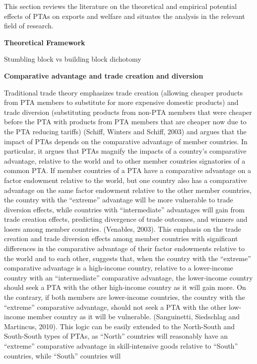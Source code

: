 This section reviews the literature on the theoretical and empirical
potential effects of PTAs on exports and welfare and situates the
analysis in the relevant field of research.

\textbf{Theoretical Framework}

Stumbling block vs building block dichotomy

\textbf{Comparative advantage and trade creation and diversion}

Traditional trade theory emphasizes trade creation (allowing cheaper
products from PTA members to substitute for more expensive domestic
products) and trade diversion (substituting products from non-PTA
members that were cheaper before the PTA with products from PTA members
that are cheaper now due to the PTA reducing tariffs) (Schiff, Winters
and Schiff, 2003) and argues that the impact of PTAs depends on the
comparative advantage of member countries. In particular, it argues that
PTAs magnify the impacts of a country's comparative advantage, relative
to the world and to other member countries signatories of a common PTA.
If member countries of a PTA have a comparative advantage on a factor
endowment relative to the world, but one country also has a comparative
advantage on the same factor endowment relative to the other member
countries, the country with the ``extreme'' advantage will be more
vulnerable to trade diversion effects, while countries with
``intermediate'' advantages will gain from trade creation effects,
predicting divergence of trade outcomes, and winners and losers among
member countries. (Venables, 2003). This emphasis on the trade creation
and trade diversion effects among member countries with significant
differences in the comparative advantage of their factor endowments
relative to the world and to each other, suggests that, when the country
with the ``extreme'' comparative advantage is a high-income country,
relative to a lower-income country with an ``intermediate'' comparative
advantage, the lower-income country should seek a PTA with the other
high-income country as it will gain more. On the contrary, if both
members are lower-income countries, the country with the ``extreme''
comparative advantage, should not seek a PTA with the other low-income
member country as it will be vulnerable. (Sanguinetti, Siedschlag and
Martincus, 2010). This logic can be easily extended to the North-South
and South-South types of PTAs, as ``North'' countries will reasonably
have an ``extreme'' comparative advantage in skill-intensive goods
relative to ``South'' countries, while ``South'' countries will
